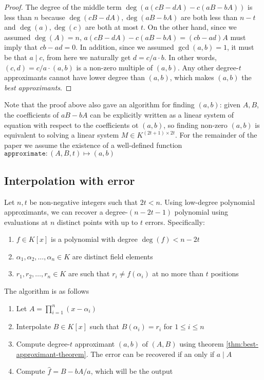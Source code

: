 \documentclass{article}
\begin{document}
\begin{proof}
    The degree of the middle term $\deg(a(cB-dA)-c(aB-bA))$ is less than $n$ because $\deg(cB-dA), \deg(aB-bA)$ are both less than $n - t$ and $\deg(a), \deg(c)$ are both at most $t$. On the other hand, since we assumed $\deg(A) = n$, $a(cB-dA)-c(aB-bA) = (cb-ad)A$ must imply that $cb-ad=0$. In addition, since we assumed $\gcd(a, b) = 1$, it must be that $a \mid c$, from here we naturally get $d = c/a \cdot b$. In other words, $(c, d) = c/a \cdot (a, b)$ is a non-zero multiple of $(a, b)$. Any other degree-$t$ approximants cannot have lower degree than $(a, b)$, which makes $(a, b)$ the \textit{best approximants}.
\end{proof}

Note that the proof above also gave an algorithm for finding $(a, b)$: given $A, B$, the coefficients of $aB-bA$ can be explicitly written as a linear system of equation with respect to the coefficients ot $(a, b)$, so finding non-zero $(a, b)$ is equivalent to solving a linear system $M \in K^{(2t+1) \times 2t}$. For the remainder of the paper we assume the existence of a well-defined function $\texttt{approximate}: (A, B, t) \mapsto (a, b)$

\subsection{Interpolation with error}\label{sec:interpolate-with-error}
Let $n, t$ be non-negative integers such that $2t < n$. Using low-degree polynomial approximants, we can recover a degree-$(n - 2t - 1)$ polynomial using evaluations at $n$ distinct points with up to $t$ errors. Specifically: \begin{enumerate}
    \item $f \in K[x]$ is a polynomial with degree $\deg(f) < n - 2t$
    \item $\alpha_1, \alpha_2, \ldots, \alpha_n \in K$ are distinct field elements
    \item $r_1, r_2, \ldots, r_n \in K$ are such that $r_i \neq f(\alpha_i)$ at no more than $t$ positions
\end{enumerate}

The algorithm is as follows \begin{enumerate}\label{alg:interpolate-with-error}
    \item Let $A = \prod_{i=1}^n(x-\alpha_i)$
    \item Interpolate $B \in K[x]$ such that $B(\alpha_i) = r_i$ for $1 \leq i \leq n$
    \item Compute degree-$t$ approximant $(a, b)$ of $(A, B)$ using theorem \ref{thm:best-approximant-theorem}. The error can be recovered if an only if $a \mid A$
    \item Compute $\hat{f} = B - bA/a$, which will be the output
\end{enumerate}
\end{document}
